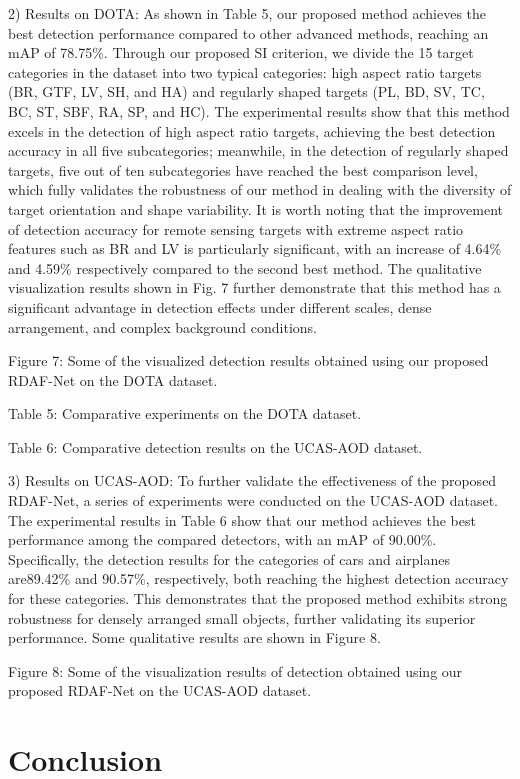 \documentclass[10pt,twocolumn,final]{article}
\begin{document}
2) Results on DOTA: As shown in Table 5, our proposed method achieves the best detection performance compared to other advanced methods, reaching an mAP of 78.75\%. Through our proposed SI criterion, we divide the 15 target categories in the dataset into two typical categories: high aspect ratio targets (BR, GTF, LV, SH, and HA) and regularly shaped targets (PL, BD, SV, TC, BC, ST, SBF, RA, SP, and HC). The experimental results show that this method excels in the detection of high aspect ratio targets, achieving the best detection accuracy in all five subcategories; meanwhile, in the detection of regularly shaped targets, five out of ten subcategories have reached the best comparison level, which fully validates the robustness of our method in dealing with the diversity of target orientation and shape variability. It is worth noting that the improvement of detection accuracy for remote sensing targets with extreme aspect ratio features such as BR and LV is particularly significant, with an increase of 4.64\% and 4.59\% respectively compared to the second best method. The qualitative visualization results shown in Fig. 7 further demonstrate that this method has a significant advantage in detection effects under different scales, dense arrangement, and complex background conditions.

Figure 7: Some of the visualized detection results obtained using our proposed RDAF-Net on the DOTA dataset.

Table 5: Comparative experiments on the DOTA dataset.

Table 6: Comparative detection results on the UCAS-AOD dataset.

3) Results on UCAS-AOD: To further validate the effectiveness of the proposed RDAF-Net, a series of experiments were conducted on the UCAS-AOD dataset. The experimental results in Table 6 show that our method achieves the best performance among the compared detectors, with an mAP of 90.00\%. Specifically, the detection results for the categories of cars and airplanes are89.42\% and 90.57\%, respectively, both reaching the highest detection accuracy for these categories. This demonstrates that the proposed method exhibits strong robustness for densely arranged small objects, further validating its superior performance. Some qualitative results are shown in Figure 8.

Figure 8: Some of the visualization results of detection obtained using our proposed RDAF-Net on the UCAS-AOD dataset.

\section{ Conclusion }
\end{document}

